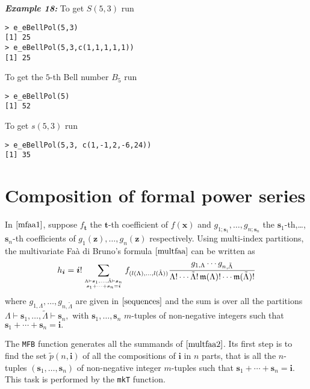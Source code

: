 \hskip-0.5cm\textbf{\emph{Example 18:}} To get \(S(5,3)\) run

\begin{verbatim}
> e_eBellPol(5,3)
[1] 25
> e_eBellPol(5,3,c(1,1,1,1,1))
[1] 25
\end{verbatim}

\noindent To get the \(5\)-th Bell number \(B_5\) run

\begin{verbatim}
> e_eBellPol(5)
[1] 52
\end{verbatim}

\noindent To get \(s(5,3)\) run

\begin{verbatim}
> e_eBellPol(5,3, c(1,-1,2,-6,24))
[1] 35
\end{verbatim}

\hypertarget{composition-of-formal-power-series}{%
\section{Composition of formal power
series}\label{composition-of-formal-power-series}}

In \(\eqref{mfaa1}\), suppose \(f_{\boldsymbol{t}}\) the
\(\boldsymbol{t}\)-th coefficient of \(f(\boldsymbol{x})\) and
\(g_{1; \boldsymbol{s}_1}, \ldots, g_{n; \boldsymbol{s}_n}\) the
\(\boldsymbol{s}_1\)-th,\ldots,\(\boldsymbol{s}_n\)-th coefficients of
\(g_1(\boldsymbol{z}), \ldots, g_n(\boldsymbol{z})\) respectively. Using
multi-index partitions, the multivariate Faà di Bruno's formula
\(\eqref{multfaa}\) can be written as \citep{MR2773373}
\begin{equation}\label{multfaa2}
h_{\boldsymbol{i}} = \boldsymbol{i}! \sum_{{\Lambda} \vdash \boldsymbol{s}_1, \ldots, \tilde{\Lambda} \vdash  \boldsymbol{s}_n \atop \boldsymbol{s}_1 + \cdots + \boldsymbol{s}_n = \boldsymbol{i}} f_{(l(\Lambda),\ldots,l(\tilde{\Lambda}))} \frac{g_{1, \Lambda} \cdots g_{n, \tilde{\Lambda}}}{\Lambda!
\cdots \tilde{\Lambda}! \, \mathfrak{m}(\Lambda)! \cdots \mathfrak{m}(\tilde{\Lambda})!}
\end{equation} where \(g_{1,\Lambda}, \ldots, g_{n,\tilde{\Lambda}}\)
are given in \(\eqref{sequences}\) and the sum is over all the
partitions
\({\Lambda} \vdash \boldsymbol{s}_1, \ldots, \tilde{\Lambda} \vdash \boldsymbol{s}_n,\)
with \(\boldsymbol{s}_1,\ldots,\boldsymbol{s}_n\) \(m\)-tuples of
non-negative integers such that
\(\boldsymbol{s}_1 + \cdots + \boldsymbol{s}_n = \boldsymbol{i}.\)

The \texttt{MFB} function generates all the summands of
\(\eqref{multfaa2}\). Its first step is to find the set
\(\tilde{p}(n,\boldsymbol{i})\) of all the compositions of
\(\boldsymbol{i}\) in \(n\) parts, that is all the \(n\)-tuples
\((\boldsymbol{s}_1,\ldots,\boldsymbol{s}_n)\) of non-negative integer
\(m\)-tuples such that
\(\boldsymbol{s}_1 + \cdots + \boldsymbol{s}_n = \boldsymbol{i}.\) This
task is performed by the \texttt{mkT} function.

